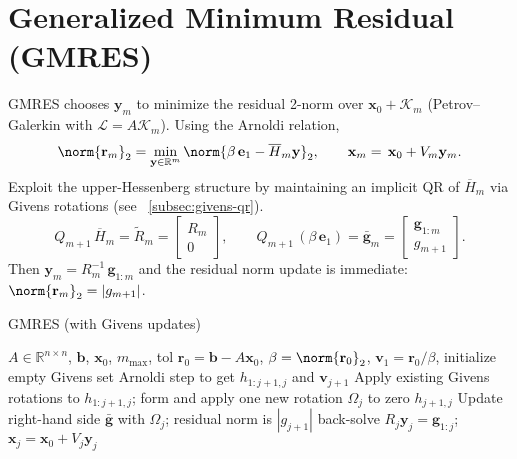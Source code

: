\section{Generalized Minimum Residual (GMRES)}
GMRES chooses $\mathbf{y}_m$ to minimize the residual 2-norm over $\mathbf{x}_0+\mathcal{K}_m$ (Petrov--Galerkin with $\mathcal{L}=A\mathcal{K}_m$). Using the Arnoldi relation,
\[
  \norm{\mathbf{r}_m}_2 = \min_{\mathbf{y}\in\mathbb{R}^m} \norm{\beta\,\mathbf{e}_1 - \overline H_m\mathbf{y}}_2,\qquad \mathbf{x}_m=\mathbf{\,x}_0+V_m\mathbf{y}_m.
\]
Exploit the upper-Hessenberg structure by maintaining an implicit QR of $\overline H_m$ via Givens rotations (see ~\autoref{subsec:givens-qr}).
\[
  Q_{m+1}\,\overline H_m = \tilde{R}_m = \begin{bmatrix} R_m \\ 0 \end{bmatrix},\qquad Q_{m+1}\,(\beta\,\mathbf{e}_1)=\bar{\mathbf{g}}_m=\begin{bmatrix}\mathbf{g}_{1:m}\\g_{m+1}\end{bmatrix}.
\]
Then $\mathbf{y}_m = R_m^{-1}\,\mathbf{g}_{1:m}$ and the residual norm update is immediate: $\norm{\mathbf{r}_m}_2 = |g_{m+1}|$.

\begin{algorithm}[H]
  \caption{GMRES (with Givens updates)}\label{alg:gmres}
  \begin{algorithmic}[0]
    \Require $A\in\mathbb{R}^{n\times n}$, $\mathbf{b}$, $\mathbf{x}_0$, $m_{\max}$, tol
    \State $\mathbf{r}_0=\mathbf{b}-A\mathbf{x}_0$, $\beta=\norm{\mathbf{r}_0}_2$, $\mathbf{v}_1=\mathbf{r}_0/\beta$, initialize empty Givens set
    \State Arnoldi step to get $h_{1:j+1,j}$ and $\mathbf{v}_{j+1}$
    \State Apply existing Givens rotations to $h_{1:j+1,j}$; form and apply one new rotation $\Omega_j$ to zero $h_{j+1,j}$
    \State Update right-hand side $\bar{\mathbf{g}}$ with $\Omega_j$; residual norm is $|g_{j+1}|$
     \State back-solve $R_j\mathbf{y}_j=\mathbf{g}_{1:j}$; \Return $\mathbf{x}_j=\mathbf{x}_0+V_j\mathbf{y}_j$ \EndIf
    \EndFor
  \end{algorithmic}
\end{algorithm}

